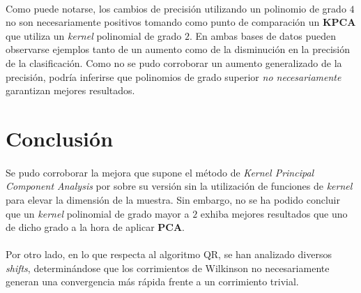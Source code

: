 \documentclass[12pt, twocolumn]{article}
\begin{document}
	\paragraph{} Como puede notarse, los cambios de precisión utilizando un polinomio de grado $4$ no son necesariamente positivos tomando como punto de comparación un \textbf{KPCA} que utiliza un \textit{kernel} polinomial de grado $2$. En ambas bases de datos pueden observarse ejemplos tanto de un aumento como de la disminución en la precisión de la clasificación. Como no se pudo corroborar un aumento generalizado de la precisión, podría inferirse que polinomios de grado superior \textit{no necesariamente} garantizan mejores resultados.
	
	\section{Conclusión}
	
	\paragraph{} Se pudo corroborar la mejora que supone el método de \textit{Kernel Principal Component Analysis} por sobre su versión sin la utilización de funciones de \textit{kernel} para elevar la dimensión de la muestra. Sin embargo, no se ha podido concluir que un \textit{kernel} polinomial de grado mayor a $2$ exhiba mejores resultados que uno de dicho grado a la hora de aplicar \textbf{PCA}.
	
	\paragraph{} Por otro lado, en lo que respecta al algoritmo QR, se han analizado diversos \textit{shifts}, determinándose que los corrimientos de Wilkinson no necesariamente generan una convergencia más rápida frente a un corrimiento trivial. 
	
\end{document}

